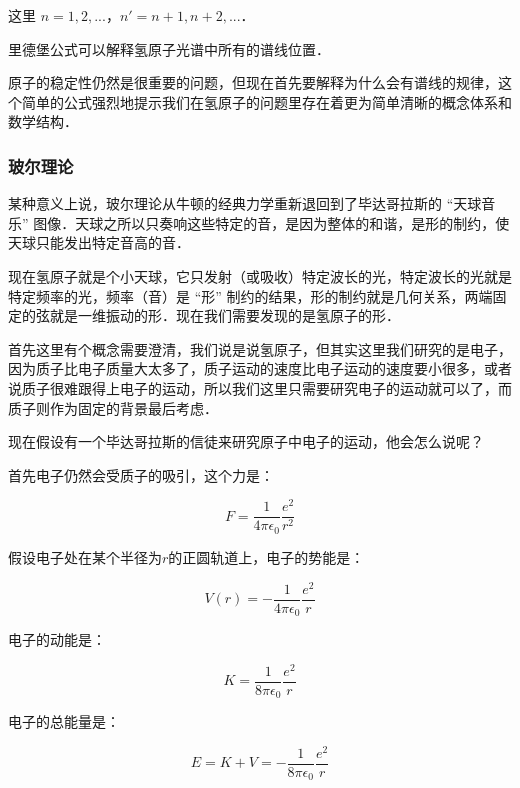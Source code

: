 这里 $n = 1,  2, ...$，$n' = n+1, n+2, ...$．

里德堡公式可以解释氢原子光谱中所有的谱线位置．

原子的稳定性仍然是很重要的问题，但现在首先要解释为什么会有谱线的规律，这个简单的公式强烈地提示我们在氢原子的问题里存在着更为简单清晰的概念体系和数学结构．

\subsubsection{玻尔理论}


某种意义上说，玻尔理论从牛顿的经典力学重新退回到了毕达哥拉斯的 “天球音乐” 图像．天球之所以只奏响这些特定的音，是因为整体的和谐，是形的制约，使天球只能发出特定音高的音．

现在氢原子就是个小天球，它只发射（或吸收）特定波长的光，特定波长的光就是特定频率的光，频率（音）是 “形” 制约的结果，形的制约就是几何关系，两端固定的弦就是一维振动的形．现在我们需要发现的是氢原子的形．

首先这里有个概念需要澄清，我们说是说氢原子，但其实这里我们研究的是电子，因为质子比电子质量大太多了，质子运动的速度比电子运动的速度要小很多，或者说质子很难跟得上电子的运动，所以我们这里只需要研究电子的运动就可以了，而质子则作为固定的背景最后考虑．

现在假设有一个毕达哥拉斯的信徒来研究原子中电子的运动，他会怎么说呢？

首先电子仍然会受质子的吸引，这个力是：

\begin{equation}
F = \frac{1}{4 \pi \epsilon_0} \frac{e^2}{ r^2 }
\end{equation}

假设电子处在某个半径为$r$的正圆轨道上，电子的势能是：

\begin{equation}
V(r) = - \frac{1}{4 \pi \epsilon_0} \frac{e^2}{ r }
\end{equation}

电子的动能是：

\begin{equation}
K = \frac{1}{8 \pi \epsilon_0} \frac{e^2}{ r }
\end{equation}

电子的总能量是：

\begin{equation}
E = K + V = - \frac{1}{8 \pi \epsilon_0} \frac{e^2}{ r }
\end{equation}


